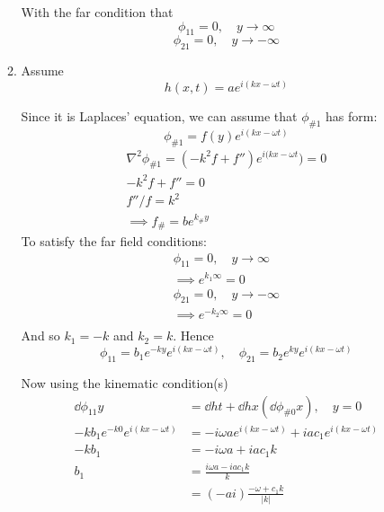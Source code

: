 \documentclass{/home/janmebows/Documents/LatexTemplates/myassignment}
\begin{document}
\begin{enumerate}
\begin{enumerate}
        With the far condition that
        \[\phi_{11} = 0 , \quad y \to \infty\]
        \[\phi_{21} = 0 , \quad y \to -\infty\]



        \item %
        Assume
         \[h(x,t) = ae^{i(kx-\omega t)}\]

        Since it is Laplaces' equation, we can assume that $\phi_{\#1}$ has form:
        \[\phi_{\#1} = f(y) e^{i(kx-\omega t)}\]
        \begin{align*}
            \nabla^2\phi_{\#1} = (-k^2 f + f'')e^{i(kx-\omega t}) = 0\\
            -k^2 f + f'' = 0\\
            f''/f = k^2\\
            \implies f_{\#} = be^{k_{\#}y}
        \end{align*}
        To satisfy the far field conditions:
        \begin{align*}
            \phi_{11} = 0 ,\quad y\to \infty\\
            \implies e^{k_{1}\infty} = 0\\
            \phi_{21} = 0 ,\quad y\to -\infty\\
            \implies e^{-k_{2}\infty} = 0\\
        \end{align*}
        And so $k_1 = -k$ and $k_2 = k$.
        Hence
        \[\phi_{11} =b_1e^{-ky} e^{i(kx-\omega t)},\quad \phi_{21} =b_2e^{ky} e^{i(kx-\omega t)}\]

        Now using the kinematic condition(s)
        \begin{align*}
            \dd{\phi_{11}}y &= \dd ht + \dd hx\left(\dd{\phi_{\#0}}x\right), \quad y=0\\
            -kb_{1} e^{-k0}e^{i(kx-\omega t)}  &= -i\omega a e^{i(kx-\omega t)} + iac_{1}e^{i(kx-\omega t)}\\
            -kb_{1} &= -i\omega a + iac_{1} k \\
            b_{1} &= \frac{i\omega a - iac_{1} k}{k}\\
            &= (-ai) \frac{-\omega + c_{1}k }{|k|}
        \end{align*}


\end{enumerate}
\end{enumerate}
\end{document}
